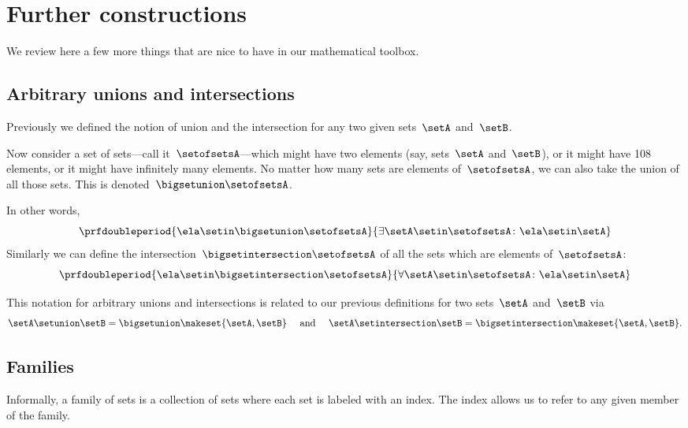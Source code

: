 
\section{Further constructions}
\label{sec:more-constructions}

We review here a few more things that are nice to have in our mathematical toolbox.

\subsection{Arbitrary unions and intersections}

Previously we defined the notion of union and the intersection for any two given sets~$\setA$ and~$\setB$.

Now consider a set of sets---call it~$\setofsetsA$---which might have two elements (say, sets~$\setA$ and~$\setB$), or it might have 108 elements, or it might have infinitely many elements.
No matter how many sets are elements of~$\setofsetsA$, we can also take the union of all those sets.
This is denoted~$\bigsetunion \setofsetsA$.

In other words,
%
\begin{equation*}
    \prfdoubleperiod{ \ela \setin\bigsetunion \setofsetsA }{\exists \setA \setin\setofsetsA \colon \ela \setin\setA}
\end{equation*}
%
Similarly we can define the intersection~$\bigsetintersection \setofsetsA$ of all the sets which are elements of~$\setofsetsA$:
%
\begin{equation*}
    \prfdoubleperiod{\ela \setin\bigsetintersection \setofsetsA}{\forall \setA \setin\setofsetsA \colon \ela \setin\setA}
\end{equation*}

This notation for arbitrary unions and intersections is related to our previous definitions for two sets~$\setA$ and~$\setB$ via
\begin{equation*}
    \setA \setunion \setB = \bigsetunion \makeset{ \setA, \setB }  \quad \text{ and } \quad \setA \setintersection \setB = \bigsetintersection \makeset{ \setA, \setB }.
\end{equation*}

\subsection{Families}

Informally, a family of sets is a collection of sets where each set is labeled with an index.
The index allows us to refer to any given member of the family.

